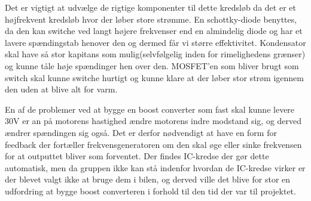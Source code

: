 Det er vigtigt at udvælge de rigtige komponenter til dette kredsløb da det er et højfrekvent kredsløb hvor der løber store strømme. En schottky-diode benyttes, da den kan switche ved langt højere frekvenser end en almindelig diode og har et lavere spændingstab henover den og dermed får vi større effektivitet. Kondensator skal have så stor kapitans som mulig(selvfølgelig inden for rimelighedens grænser) og kunne tåle høje spændinger hen over den. MOSFET'en som bliver brugt som switch skal kunne switche hurtigt og kunne klare at der løber stor strøm igennem den uden at blive alt for varm.

En af de problemer ved at bygge en boost converter som fast skal kunne levere 30V er an på motorens hastighed ændre motorens indre modstand sig, og derved ændrer spændingen sig også. Det er derfor nødvendigt at have en form for feedback der fortæller frekvensgeneratoren om den skal øge eller sinke frekvensen for at outputtet bliver som forventet. Der findes IC-kredse der gør dette automatisk, men da gruppen ikke kan stå indenfor hvordan de IC-kredse virker er der blevet valgt ikke at bruge dem i  bilen, og derved ville det blive for stor en udfordring at bygge boost converteren i forhold til den tid der var til projektet.
